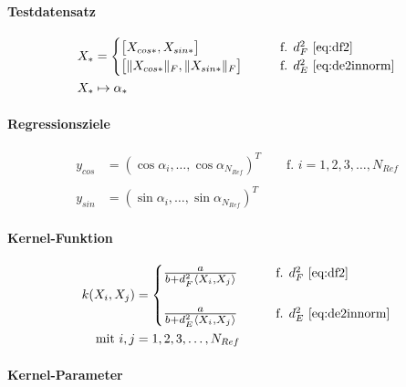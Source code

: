 \paragraph*{Testdatensatz}


\begin{align}\label{eq:testds}
	X_* &= 
	\begin{cases}
		\big[ X_{cos*}, X_{sin*} \big]             &\qquad \text{f. } d_F^2 \text{ \eqref{eq:df2}} \\
		\big[ \|X_{cos*}\|_F, \|X_{sin*}\|_F \big] &\qquad \text{f. } d_E^2 \text{ \eqref{eq:de2innorm}}
	\end{cases} \\
	X_* & \mapsto \alpha_* \nonumber
\end{align}



\paragraph*{Regressionsziele}


\begin{align}\label{eq:gprtarget}
	y_{cos} &= (\cos \alpha_i, \ldots, \cos \alpha_{N_{Ref}})^T \qquad \text{f. } i = 1,2,3,\ldots,N_{Ref} \nonumber \\
	\\
	y_{sin} &= (\sin \alpha_i, \ldots, \sin \alpha_{N_{Ref}})^T \nonumber
\end{align}


\paragraph*{Kernel-Funktion}


\begin{align}\label{eq:kfun}
	k(X_i, X_j) &= 
		\begin{cases}
			\resizebox{.17\linewidth}{!}{$\frac{a}{b + d_F^2\langle X_i, X_j \rangle}$} &\qquad \text{f. } d_F^2 \text{ \eqref{eq:df2}} \\\\
			\resizebox{.17\linewidth}{!}{$\frac{a}{b + d_E^2\langle X_i, X_j \rangle}$} &\qquad \text{f. } d_E^2 \text{ \eqref{eq:de2innorm}}
		\end{cases} \\
\text{mit } i,j &= 1,2,3,\ldots,N_{Ref} \nonumber
\end{align}


\paragraph*{Kernel-Parameter}


